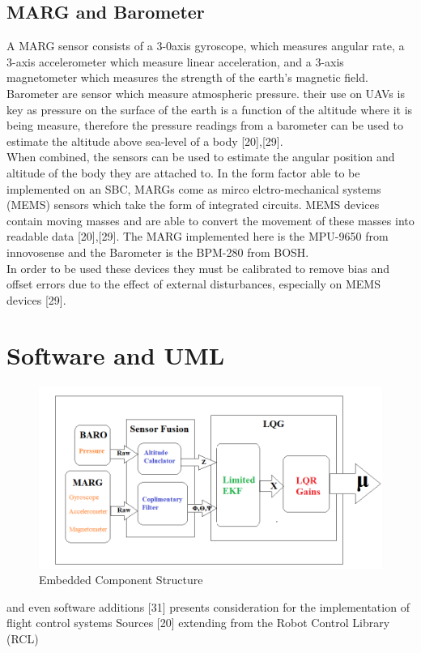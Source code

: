 \documentclass[12pt,a4paper,twoside]{report}
\begin{document}
			\subsection{MARG and Barometer}
			
				A MARG sensor consists of a 3-0axis gyroscope, which measures angular rate, a 3-axis accelerometer which measure linear acceleration, and a 3-axis magnetometer which measures the strength of the earth's magnetic field. 
				\\
				Barometer are sensor which measure atmospheric pressure. their use on UAVs is key as pressure on the surface of the earth is a function of the altitude where it is being measure, therefore the pressure readings from a barometer can be used to estimate the altitude above sea-level of a body [20],[29].
				\\
				When combined, the sensors can be used to estimate the angular position and altitude of the body they are attached to. In the form factor able to be implemented on an SBC, MARGs come as mirco elctro-mechanical systems (MEMS) sensors which take the form of integrated circuits. MEMS devices contain moving masses and are able to convert the movement of these masses into readable data [20],[29]. The MARG implemented here is the MPU-9650 from innovosense and the Barometer is the BPM-280 from BOSH.
				\\
				In order to be used these devices they must be calibrated to remove bias and offset errors due to the effect of external disturbances, especially on MEMS devices [29]. 
					
		\section{Software and UML}
			
			\begin{figure}[h!]
				\centering
				\includegraphics[width=1\linewidth]{ImplementationStructure.png}
				\caption{Embedded Component Structure}
				\label{fig:embeddedcomponentstructure}
			\end{figure}
			and even software additions 
			[31] presents consideration for the implementation of flight control systems
			Sources [20] extending from the Robot Control Library (RCL)
		
\end{document}

